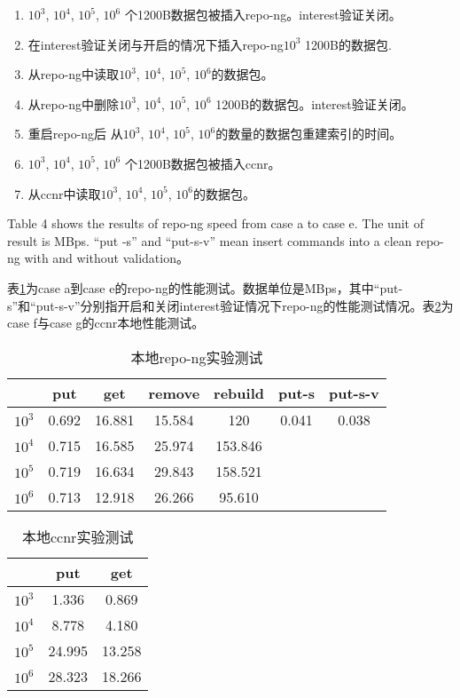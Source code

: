 \begin{enumerate}[a]
\item $10^3$, $10^4$, $10^5$, $10^6$ 个1200B数据包被插入repo-ng。interest验证关闭。
\item 在interest验证关闭与开启的情况下插入repo-ng$10^3$ 1200B的数据包.
\item 从repo-ng中读取$10^3$, $10^4$, $10^5$, $10^6$的数据包。
\item 从repo-ng中删除$10^3$, $10^4$, $10^5$, $10^6$ 1200B的数据包。interest验证关闭。 
\item 重启repo-ng后 从$10^3$, $10^4$, $10^5$, $10^6$的数量的数据包重建索引的时间。
\item $10^3$, $10^4$, $10^5$, $10^6$ 个1200B数据包被插入ccnr。
\item 从ccnr中读取$10^3$, $10^4$, $10^5$, $10^6$的数据包。
\end{enumerate}

Table 4 shows the results of repo-ng speed from case a to case e. The unit of result is MBps. ``put -s'' and ``put-s-v'' mean insert commands into a clean repo-ng with and without validation。

表\ref{tab:repo-ng-local}为case a到case e的repo-ng的性能测试。数据单位是MBps，其中“put-s”和“put-s-v”分别指开启和关闭interest验证情况下repo-ng的性能测试情况。表\ref{tab:ccnr-local}为case f与case g的ccnr本地性能测试。

\begin{table}[!htbp]
\centering
\caption{本地repo-ng实验测试}
\label{tab:repo-ng-local}
\begin{tabular}{ | c | c | c | c | c | c | c | }
    \hline
           & put & get & remove & rebuild & put-s & put-s-v \\ \hline
    $10^3$ & 0.692 & 16.881 & 15.584 & 120 & 0.041 & 0.038  \\ \hline
    $10^4$ & 0.715 & 16.585 & 25.974 & 153.846 & & \\ \hline
    $10^5$ & 0.719 & 16.634 & 29.843 & 158.521 & & \\ \hline
    $10^6$ & 0.713 & 12.918 & 26.266 & 95.610 & &\\ \hline
\end{tabular}
\end{table}

\begin{table}
\centering
\caption{本地ccnr实验测试}
\label{tab:ccnr-local}
\begin{tabular}{ | c | c | c | }
    \hline
           & put & get \\ \hline
    $10^3$ & 1.336 & 0.869 \\ \hline
    $10^4$ & 8.778 & 4.180 \\ \hline
    $10^5$ & 24.995 & 13.258 \\ \hline
    $10^6$ & 28.323 & 18.266 \\ \hline
\end{tabular}
\end{table}

